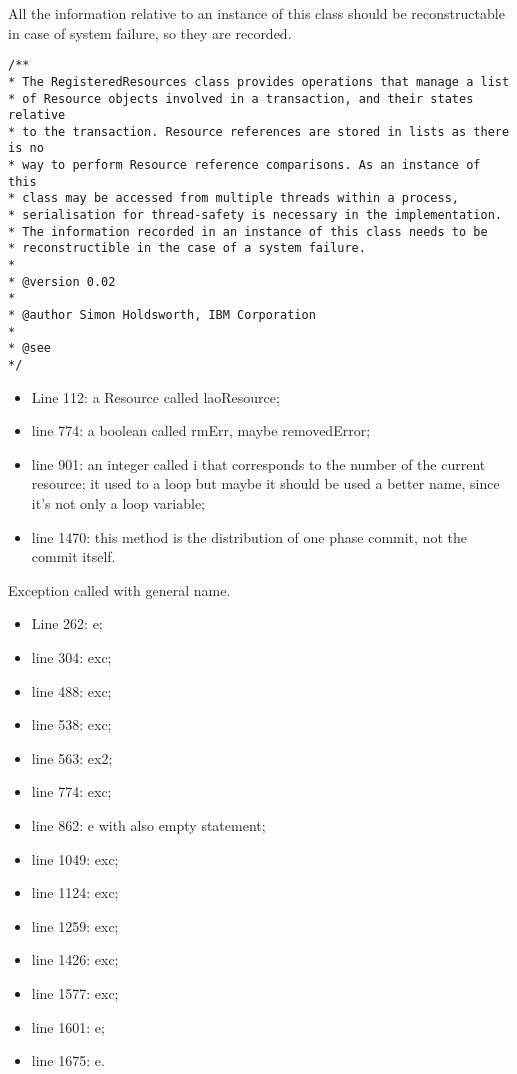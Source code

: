 \begin{enumerate}
	All the information relative to an instance of this class should be reconstructable in case of system failure, so they are recorded.
\begin{lstlisting}
/**
* The RegisteredResources class provides operations that manage a list
* of Resource objects involved in a transaction, and their states relative
* to the transaction. Resource references are stored in lists as there is no
* way to perform Resource reference comparisons. As an instance of this
* class may be accessed from multiple threads within a process,
* serialisation for thread-safety is necessary in the implementation.
* The information recorded in an instance of this class needs to be
* reconstructible in the case of a system failure.
*
* @version 0.02
*
* @author Simon Holdsworth, IBM Corporation
*
* @see
*/
\end{lstlisting}
	\begin{itemize}
		\item Line 112: a Resource called laoResource;
		\item line 774: a boolean called rmErr, maybe removedError;
		\item line 901: an integer called i that corresponds to the number of the current resource; it used to a loop but maybe it should be used a better name, since it's not only a loop variable;
		\item line 1470: this method is the distribution of one phase commit, not the commit itself.
	\end{itemize}
	Exception called with general name.
	\begin{itemize}
		\item Line 262: e;
		\item line 304: exc;
		\item line 488: exc;
		\item line 538: exc;
		\item line 563: ex2;
		\item line 774: exc;
		\item line 862: e with also empty statement;
		\item line 1049: exc;
		\item line 1124: exc;
		\item line 1259: exc;
		\item line 1426: exc;
		\item line 1577: exc;
		\item line 1601: e;
		\item line 1675: e.
	\end{itemize}

\end{enumerate}

